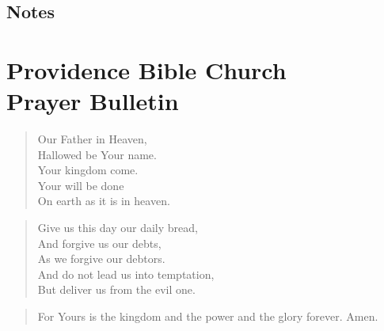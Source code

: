 \documentclass[12pt,twocolumn]{article}
\newcommand{\B}{\begin{description}}
\newcommand{\E}{\end{description}}
\newcommand{\Q}[1]{\parbox{\columnwidth}{\begin{quote} #1 \end{quote}}}
\begin{document}
\subsection*{Notes}
\pagebreak
\section*{Providence Bible Church \\Prayer Bulletin}
\Q{ Our Father in Heaven, \\
    Hallowed be Your name. \\
    Your kingdom come. \\
    Your will be done \\
    On earth as it is in heaven.} 
\B
\E

\Q{ Give us this day our daily bread, \\
    And forgive us our debts, \\
    As we forgive our debtors. \\
    And do not lead us into temptation, \\
    But deliver us from the evil one.}
\B
\E

\Q{ For Yours is the kingdom and the power and the glory forever. Amen.}
\end{document}
